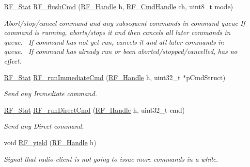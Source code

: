 \begin{DoxyCompactItemize}
\begin{DoxyCompactList}
 \end{DoxyCompactList}\item 
\hyperlink{_r_f_8h_afdc219ddabc8427ecd552a6c78d9988f}{R\+F\+\_\+\+Stat} \hyperlink{_r_f_8h_ae3ff5c614f4a63cb4e79c90f9229149a}{R\+F\+\_\+flush\+Cmd} (\hyperlink{_r_f_8h_a5e8ab7fc87fb818f435d9b6226ee573f}{R\+F\+\_\+\+Handle} h, \hyperlink{_r_f_8h_acab1f56c62a9fd1ad0a91a46b6da23f1}{R\+F\+\_\+\+Cmd\+Handle} ch, uint8\+\_\+t mode)
\begin{DoxyCompactList}\small\item\em Abort/stop/cancel command and any subsequent commands in command queue If command is running, aborts/stops it and then cancels all later commands in queue.~\newline
 If command has not yet run, cancels it and all later commands in queue.~\newline
 If command has already run or been aborted/stopped/cancelled, has no effect.~\newline
 \end{DoxyCompactList}\item 
\hyperlink{_r_f_8h_afdc219ddabc8427ecd552a6c78d9988f}{R\+F\+\_\+\+Stat} \hyperlink{_r_f_8h_a6159b409f8d99954529a8ebf6f98cd85}{R\+F\+\_\+run\+Immediate\+Cmd} (\hyperlink{_r_f_8h_a5e8ab7fc87fb818f435d9b6226ee573f}{R\+F\+\_\+\+Handle} h, uint32\+\_\+t $\ast$p\+Cmd\+Struct)
\begin{DoxyCompactList}\small\item\em Send any Immediate command. ~\newline
 \end{DoxyCompactList}\item 
\hyperlink{_r_f_8h_afdc219ddabc8427ecd552a6c78d9988f}{R\+F\+\_\+\+Stat} \hyperlink{_r_f_8h_aafce617271300f2bee1a52ebda6d654e}{R\+F\+\_\+run\+Direct\+Cmd} (\hyperlink{_r_f_8h_a5e8ab7fc87fb818f435d9b6226ee573f}{R\+F\+\_\+\+Handle} h, uint32\+\_\+t cmd)
\begin{DoxyCompactList}\small\item\em Send any Direct command. ~\newline
 \end{DoxyCompactList}\item 
void \hyperlink{_r_f_8h_a299ada7963c727a40466d7d1bb7296a3}{R\+F\+\_\+yield} (\hyperlink{_r_f_8h_a5e8ab7fc87fb818f435d9b6226ee573f}{R\+F\+\_\+\+Handle} h)
\begin{DoxyCompactList}\small\item\em Signal that radio client is not going to issue more commands in a while. ~\newline

\end{DoxyCompactList}
\end{DoxyCompactItemize}
